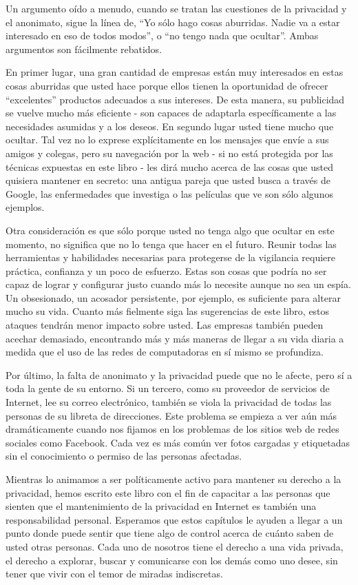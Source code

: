 \documentclass[10pt,a5paper,twoside,,]{book}
\begin{document}
Un argumento oído a menudo, cuando se tratan las cuestiones de la
privacidad y el anonimato, sigue la línea de, ``Yo sólo hago cosas
aburridas. Nadie va a estar interesado en eso de todos modos'', o ``no
tengo nada que ocultar''. Ambas argumentos son fácilmente rebatidos.

En primer lugar, una gran cantidad de empresas están muy interesados en
estas cosas aburridas que usted hace porque ellos tienen la oportunidad
de ofrecer ``excelentes'' productos adecuados a sus intereses. De esta
manera, su publicidad se vuelve mucho más eficiente - son capaces de
adaptarla específicamente a las necesidades asumidas y a los deseos. En
segundo lugar usted tiene mucho que ocultar. Tal vez no lo exprese
explícitamente en los mensajes que envíe a sus amigos y colegas, pero su
navegación por la web - si no está protegida por las técnicas expuestas
en este libro - les dirá mucho acerca de las cosas que usted quisiera
mantener en secreto: una antigua pareja que usted busca a través de
Google, las enfermedades que investiga o las películas que ve son sólo
algunos ejemplos.

Otra consideración es que sólo porque usted no tenga algo que ocultar en
este momento, no significa que no lo tenga que hacer en el futuro.
Reunir todas las herramientas y habilidades necesarias para protegerse
de la vigilancia requiere práctica, confianza y un poco de esfuerzo.
Estas son cosas que podría no ser capaz de lograr y configurar justo
cuando más lo necesite aunque no sea un espía. Un obsesionado, un
acosador persistente, por ejemplo, es suficiente para alterar mucho su
vida. Cuanto más fielmente siga las sugerencias de este libro, estos
ataques tendrán menor impacto sobre usted. Las empresas también pueden
acechar demasiado, encontrando más y más maneras de llegar a su vida
diaria a medida que el uso de las redes de computadoras en sí mismo se
profundiza.

Por último, la falta de anonimato y la privacidad puede que no le
afecte, pero sí a toda la gente de su entorno. Si un tercero, como su
proveedor de servicios de Internet, lee su correo electrónico, también
se viola la privacidad de todas las personas de su libreta de
direcciones. Este problema se empieza a ver aún más dramáticamente
cuando nos fijamos en los problemas de los sitios web de redes sociales
como Facebook. Cada vez es más común ver fotos cargadas y etiquetadas
sin el conocimiento o permiso de las personas afectadas.

Mientras lo animamos a ser políticamente activo para mantener su derecho
a la privacidad, hemos escrito este libro con el fin de capacitar a las
personas que sienten que el mantenimiento de la privacidad en Internet
es también una responsabilidad personal. Esperamos que estos capítulos
le ayuden a llegar a un punto donde puede sentir que tiene algo de
control acerca de cuánto saben de usted otras personas. Cada uno de
nosotros tiene el derecho a una vida privada, el derecho a explorar,
buscar y comunicarse con los demás como uno desee, sin tener que vivir
con el temor de miradas indiscretas.
\end{document}
